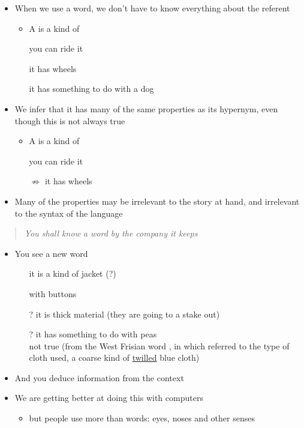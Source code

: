 \documentclass[a4paper,landscape,headrule,footrule,xetex]{foils}
\begin{document}
\begin{itemize}\addtolength{\itemsep}{-1.5ex}
\item When we use a word, we don't have to know everything about the
  referent
  \begin{itemize}
  \item A  is a kind of 
  \item[\ent] you can ride it
  \item[\ent] it has wheels
  \item[\ent] it has something to do with a dog
  \end{itemize}
\item We infer that it has many of the same properties as its
  hypernym, even though this is not always true
 \begin{itemize}
  \item A  is a kind of 
  \item[\ent] you can ride it
  \item[$\not\Rightarrow$] it has wheels
  \end{itemize}
\item Many of the properties may be irrelevant to the story at hand,
  and irrelevant to the syntax of the language
\end{itemize}

\vspace*{-1ex}
\begin{quote}
  \textit{You shall know a word by the company it keeps} \hfill
\citep[p11]{Firth:1957}
\end{quote}
\vspace*{-1ex}
\begin{itemize}\addtolength{\itemsep}{-2ex}
\item You see a new word 
\\ 
\begin{itemize}
\item[\ent] it is a kind of jacket \hfill(?)
\item[\ent] with buttons
\item [?] it is thick material (they are going to a stake out)
\item[?] it has something to do with peas \\ not true (from the West
  Frisian word , in which  referred to the
  type of cloth used, a coarse kind of \ul{twilled} blue cloth)
\end{itemize}
\item And you deduce information from the context
\item We are getting better at doing this with computers
\begin{itemize}
\item but people use more than words: eyes, noses and other senses
\end{itemize}

\end{itemize}
\end{document}

